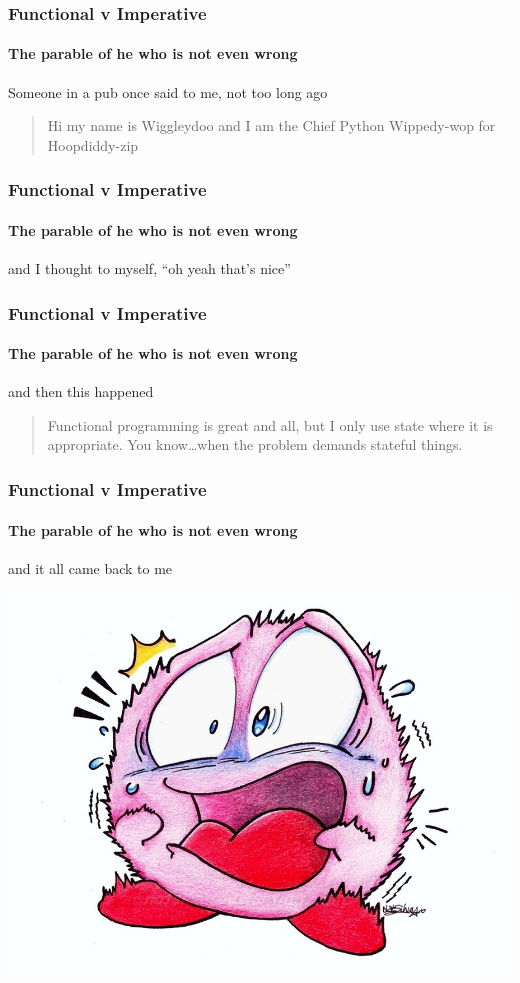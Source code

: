 {

\begin{frame}
\frametitle{Functional v Imperative}
\framesubtitle{The parable of he who is not even wrong}
Someone in a pub once said to me, not too long ago
\begin{quote}
Hi my name is Wiggleydoo and I am the Chief Python Wippedy-wop for Hoopdiddy-zip
\end{quote}
\end{frame}


\begin{frame}
\frametitle{Functional v Imperative}
\framesubtitle{The parable of he who is not even wrong}
and I thought to myself, ``oh yeah that's nice''
\end{frame}


\begin{frame}
\frametitle{Functional v Imperative}
\framesubtitle{The parable of he who is not even wrong}
and then this happened
\begin{quote}
Functional programming is great and all, but I only use state where it is appropriate. You know\ldots when the problem demands stateful things.
\end{quote}
\end{frame}


\begin{frame}
\frametitle{Functional v Imperative}
\framesubtitle{The parable of he who is not even wrong}
\begin{center}
and it all came back to me
\end{center}
\begin{center}
\includegraphics[width=0.7\paperwidth]{image/shock.jpg}
\end{center}
\end{frame}


}
